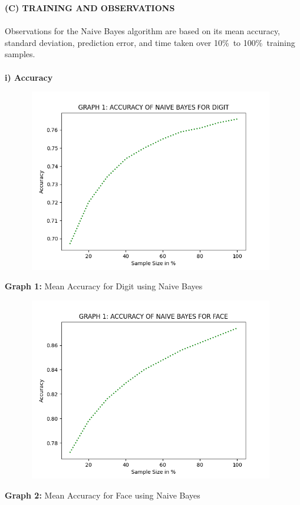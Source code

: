 \documentclass[10 pt]{report}   	%
\begin{document}
{\textbf{(C) TRAINING AND OBSERVATIONS} \\ \\
Observations for the Naive Bayes algorithm are based on its mean accuracy, standard deviation, prediction error, and time taken over 10\%\ to 100\%\ training samples. \\ \\
\textbf{i) Accuracy}
\begin{figure} [H]
\includegraphics [width = 11cm, height = 8cm]{NB_ACC_DIGIT.png}
\end {figure}
\begin{center}
\small \textbf {Graph 1:} Mean Accuracy for Digit using Naive Bayes\\
\end{center}
\begin{figure} [H]
\includegraphics [width = 11cm, height = 8cm]{NB_ACC_FACE.png}
\end {figure}
\begin{center}
\small \textbf {Graph 2:} Mean Accuracy for Face using Naive Bayes\\

\end{center}}
\end{document}
